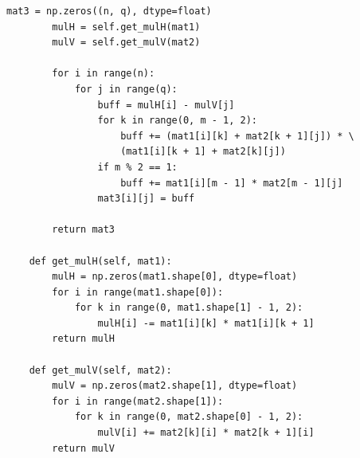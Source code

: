 \documentclass[a4paper,oneside,14pt]{extreport}
\begin{document}
\begin{lstlisting}[caption=Оптимизированный алгоритм Копперсмита-Винограда (часть 2), label={lst:optVinograd}]
		mat3 = np.zeros((n, q), dtype=float)
		mulH = self.get_mulH(mat1)
		mulV = self.get_mulV(mat2)
		
		for i in range(n):
			for j in range(q):
				buff = mulH[i] - mulV[j]
				for k in range(0, m - 1, 2):
					buff += (mat1[i][k] + mat2[k + 1][j]) * \
					(mat1[i][k + 1] + mat2[k][j])
				if m % 2 == 1:
					buff += mat1[i][m - 1] * mat2[m - 1][j]
				mat3[i][j] = buff
		
		return mat3
	
	def get_mulH(self, mat1):
		mulH = np.zeros(mat1.shape[0], dtype=float)
		for i in range(mat1.shape[0]):
			for k in range(0, mat1.shape[1] - 1, 2):
				mulH[i] -= mat1[i][k] * mat1[i][k + 1]
		return mulH
	
	def get_mulV(self, mat2):
		mulV = np.zeros(mat2.shape[1], dtype=float)
		for i in range(mat2.shape[1]):
			for k in range(0, mat2.shape[0] - 1, 2):
				mulV[i] += mat2[k][i] * mat2[k + 1][i]
		return mulV
\end{lstlisting}
\end{document}
